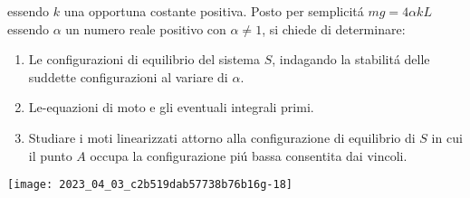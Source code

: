 \documentclass[10pt]{article}
\begin{document}
essendo \(k\) una opportuna costante positiva. Posto per semplicitá \(m g=4 \alpha k L\) essendo \(\alpha\) un numero reale positivo con \(\alpha \neq 1\), si chiede di determinare:

\begin{enumerate}
  \item Le configurazioni di equilibrio del sistema \(S\), indagando la stabilitá delle suddette configurazioni al variare di \(\alpha\).

  \item Le-equazioni di moto e gli eventuali integrali primi.

  \item Studiare i moti linearizzati attorno alla configurazione di equilibrio di \(S\) in cui il punto \(A\) occupa la configurazione piú bassa consentita dai vincoli.

\end{enumerate}

\begin{center}
\texttt{[image: 2023\_04\_03\_c2b519dab57738b76b16g-18]}
\end{center}
\end{document}
